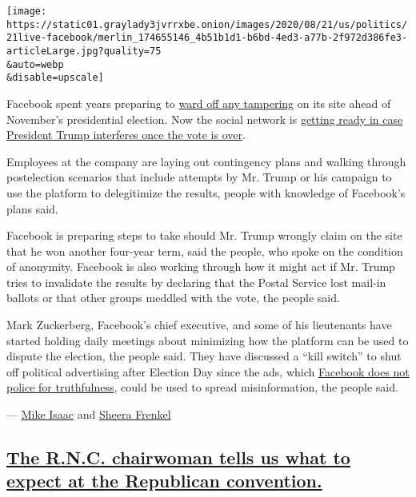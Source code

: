 \texttt{[image: https://static01.graylady3jvrrxbe.onion/images/2020/08/21/us/politics/21live-facebook/merlin\_174655146\_4b51b1d1-b6bd-4ed3-a77b-2f972d386fe3-articleLarge.jpg?quality=75\\\&auto=webp\\\&disable=upscale]}

Facebook spent years preparing to
\href{https://www.nytimes3xbfgragh.onion/2020/03/29/technology/facebook-google-twitter-november-election.html}{ward
off any tampering} on its site ahead of November's presidential
election. Now the social network is
\href{https://www.nytimes3xbfgragh.onion/2020/08/21/technology/facebook-trump-election.html}{getting
ready in case President Trump interferes once the vote is over}.

Employees at the company are laying out contingency plans and walking
through postelection scenarios that include attempts by Mr. Trump or his
campaign to use the platform to delegitimize the results, people with
knowledge of Facebook's plans said.

Facebook is preparing steps to take should Mr. Trump wrongly claim on
the site that he won another four-year term, said the people, who spoke
on the condition of anonymity. Facebook is also working through how it
might act if Mr. Trump tries to invalidate the results by declaring that
the Postal Service lost mail-in ballots or that other groups meddled
with the vote, the people said.

Mark Zuckerberg, Facebook's chief executive, and some of his lieutenants
have started holding daily meetings about minimizing how the platform
can be used to dispute the election, the people said. They have
discussed a ``kill switch'' to shut off political advertising after
Election Day since the ads, which
\href{https://www.nytimes3xbfgragh.onion/2019/10/17/business/zuckerberg-facebook-free-speech.html}{Facebook
does not police for truthfulness}, could be used to spread
misinformation, the people said.

--- \href{https://www.nytimes3xbfgragh.onion/by/mike-isaac}{Mike Isaac}
and \href{https://www.nytimes3xbfgragh.onion/by/sheera-frenkel}{Sheera
Frenkel}

\hypertarget{the-rnc-chairwoman-tells-us-what-to-expect-at-the-republican-convention}{%
\subsection{\texorpdfstring{\protect\hyperlink{the-rnc-chairwoman-tells-us-what-to-expect-at-the-republican-convention}{The
R.N.C. chairwoman tells us what to expect at the Republican
convention.}}{The R.N.C. chairwoman tells us what to expect at the Republican convention.}}\label{the-rnc-chairwoman-tells-us-what-to-expect-at-the-republican-convention}}

